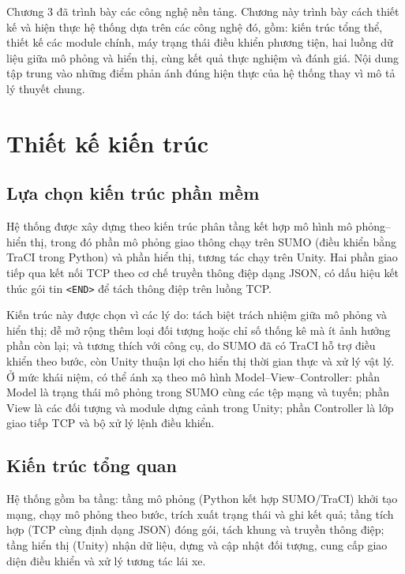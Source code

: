 \documentclass[../DoAn.tex]{subfiles}
\begin{document}
Chương 3 đã trình bày các công nghệ nền tảng. Chương này trình bày cách thiết kế
và hiện thực hệ thống dựa trên các công nghệ đó, gồm: kiến trúc tổng thể, thiết
kế các module chính, máy trạng thái điều khiển phương tiện, hai luồng dữ liệu
giữa mô phỏng và hiển thị, cùng kết quả thực nghiệm và đánh giá. Nội dung tập
trung vào những điểm phản ánh đúng hiện thực của hệ thống thay vì mô tả lý thuyết
chung.

\section{Thiết kế kiến trúc}

\subsection{Lựa chọn kiến trúc phần mềm}

Hệ thống được xây dựng theo kiến trúc phân tầng kết hợp mô hình mô phỏng--hiển
thị, trong đó phần mô phỏng giao thông chạy trên \gls{SUMO} (điều khiển bằng
\gls{TraCI} trong Python) và phần hiển thị, tương tác chạy trên Unity. Hai phần
giao tiếp qua kết nối TCP theo cơ chế truyền thông điệp dạng \gls{JSON}, có dấu
hiệu kết thúc gói tin \texttt{<END>} để tách thông điệp trên luồng TCP.

Kiến trúc này được chọn vì các lý do: tách biệt trách nhiệm giữa mô phỏng và hiển
thị; dễ mở rộng thêm loại đối tượng hoặc chỉ số thống kê mà ít ảnh hưởng phần còn
lại; và tương thích với công cụ, do \gls{SUMO} đã có \gls{TraCI} hỗ trợ điều
khiển theo bước, còn Unity thuận lợi cho hiển thị thời gian thực và xử lý vật lý.
Ở mức khái niệm, có thể ánh xạ theo mô hình Model--View--Controller: phần Model là
trạng thái mô phỏng trong \gls{SUMO} cùng các tệp mạng và tuyến; phần View là các
đối tượng và module dựng cảnh trong Unity; phần Controller là lớp giao tiếp TCP
và bộ xử lý lệnh điều khiển.

\subsection{Kiến trúc tổng quan}

Hệ thống gồm ba tầng: tầng mô phỏng (Python kết hợp \gls{SUMO}/\gls{TraCI}) khởi
tạo mạng, chạy mô phỏng theo bước, trích xuất trạng thái và ghi kết quả; tầng
tích hợp (TCP cùng định dạng \gls{JSON}) đóng gói, tách khung và truyền thông
điệp; tầng hiển thị (Unity) nhận dữ liệu, dựng và cập nhật đối tượng, cung cấp
giao diện điều khiển và xử lý tương tác lái xe.
\end{document}
